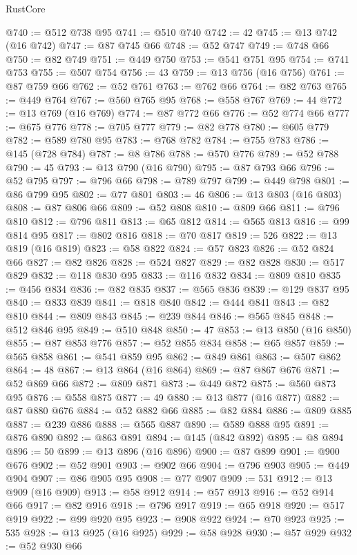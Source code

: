 \begin{lexlean}{RustCore}
\begin{coremodule}
@740 := @512 @738 @95
@741 := @510 @740
@742 := 42
@745 := @13 @742 (@16 @742)
@747 := @87 @745 @66
@748 := @52 @747
@749 := @748 @66
@750 := @82 @749
@751 := @449 @750
@753 := @541 @751 @95
@754 := @741 @753
@755 := @507 @754
@756 := 43
@759 := @13 @756 (@16 @756)
@761 := @87 @759 @66
@762 := @52 @761
@763 := @762 @66
@764 := @82 @763
@765 := @449 @764
@767 := @560 @765 @95
@768 := @558 @767
@769 := 44
@772 := @13 @769 (@16 @769)
@774 := @87 @772 @66
@776 := @52 @774 @66
@777 := @675 @776
@778 := @705 @777
@779 := @82 @778
@780 := @605 @779
@782 := @589 @780 @95
@783 := @768 @782
@784 := @755 @783
@786 := @145 (@728 @784)
@787 := @8 @786
@788 := @570 @776
@789 := @52 @788
@790 := 45
@793 := @13 @790 (@16 @790)
@795 := @87 @793 @66
@796 := @52 @795
@797 := @796 @66
@798 := @789 @797
@799 := @449 @798
@801 := @86 @799 @95
@802 := @77 @801
@803 := 46
@806 := @13 @803 (@16 @803)
@808 := @87 @806 @66
@809 := @52 @808
@810 := @809 @66
@811 := @796 @810
@812 := @796 @811
@813 := @65 @812
@814 := @565 @813
@816 := @99 @814 @95
@817 := @802 @816
@818 := @70 @817
@819 := 526
@822 := @13 @819 (@16 @819)
@823 := @58 @822
@824 := @57 @823
@826 := @52 @824 @66
@827 := @82 @826
@828 := @524 @827
@829 := @82 @828
@830 := @517 @829
@832 := @118 @830 @95
@833 := @116 @832
@834 := @809 @810
@835 := @456 @834
@836 := @82 @835
@837 := @565 @836
@839 := @129 @837 @95
@840 := @833 @839
@841 := @818 @840
@842 := @444 @841
@843 := @82 @810
@844 := @809 @843
@845 := @239 @844
@846 := @565 @845
@848 := @512 @846 @95
@849 := @510 @848
@850 := 47
@853 := @13 @850 (@16 @850)
@855 := @87 @853 @776
@857 := @52 @855 @834
@858 := @65 @857
@859 := @565 @858
@861 := @541 @859 @95
@862 := @849 @861
@863 := @507 @862
@864 := 48
@867 := @13 @864 (@16 @864)
@869 := @87 @867 @676
@871 := @52 @869 @66
@872 := @809 @871
@873 := @449 @872
@875 := @560 @873 @95
@876 := @558 @875
@877 := 49
@880 := @13 @877 (@16 @877)
@882 := @87 @880 @676
@884 := @52 @882 @66
@885 := @82 @884
@886 := @809 @885
@887 := @239 @886
@888 := @565 @887
@890 := @589 @888 @95
@891 := @876 @890
@892 := @863 @891
@894 := @145 (@842 @892)
@895 := @8 @894
@896 := 50
@899 := @13 @896 (@16 @896)
@900 := @87 @899
@901 := @900 @676
@902 := @52 @901
@903 := @902 @66
@904 := @796 @903
@905 := @449 @904
@907 := @86 @905 @95
@908 := @77 @907
@909 := 531
@912 := @13 @909 (@16 @909)
@913 := @58 @912
@914 := @57 @913
@916 := @52 @914 @66
@917 := @82 @916
@918 := @796 @917
@919 := @65 @918
@920 := @517 @919
@922 := @99 @920 @95
@923 := @908 @922
@924 := @70 @923
@925 := 535
@928 := @13 @925 (@16 @925)
@929 := @58 @928
@930 := @57 @929
@932 := @52 @930 @66

\end{coremodule}
\end{lexlean}

